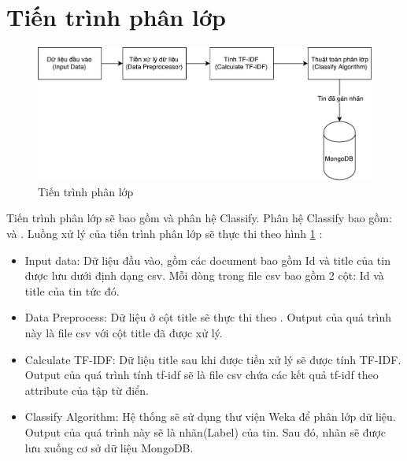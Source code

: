 \section{Tiến trình phân lớp}
\begin{figure}[H]
	\centering
	\includegraphics[width=0.9\linewidth]{Chapter3/Chapter3Figs/PDF/ClassifyProcess}
	\caption{Tiến trình phân lớp}
	\label{fig:classifyprocess}
\end{figure}
Tiến trình phân lớp sẽ bao gồm  và phân hệ Classify.
Phân hệ Classify bao gồm:  và .
Luồng xử lý của tiến trình phân lớp sẽ thực thi theo hình \ref{fig:classifyprocess} :
\begin{itemize}
	\item Input data: Dữ liệu đầu vào, gồm các document bao gồm Id và title của tin được lưu dưới định dạng csv. Mỗi dòng trong file csv bao gồm 2 cột: Id và title của tin tức đó.
	\item Data Preprocess: Dữ liệu ở cột title  sẽ thực thi theo . Output của quá trình này là file csv với cột title đã được xử lý.
	\item Calculate TF-IDF: Dữ liệu title sau khi được tiền xử lý sẽ được tính TF-IDF. Output của quá trình tính tf-idf sẽ là file csv chứa các kết quả tf-idf theo attribute của tập từ điển.
	\item Classify Algorithm: Hệ thống sẽ sử dụng thư viện Weka để phân lớp dữ liệu. Output của quá trình này sẽ là nhãn(Label) của tin. Sau đó, nhãn sẽ được lưu xuống cơ sở dữ liệu MongoDB.
\end{itemize}


